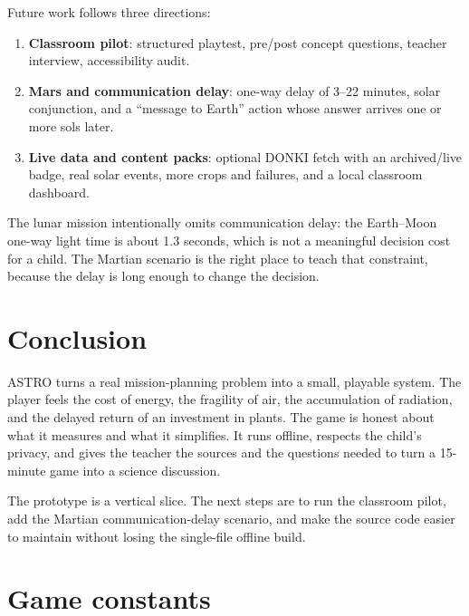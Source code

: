 \documentclass[11pt,a4paper]{article}
\begin{document}
Future work follows three directions:

\begin{enumerate}
  \item \textbf{Classroom pilot}: structured playtest, pre/post concept questions, teacher interview, accessibility audit.
  \item \textbf{Mars and communication delay}: one-way delay of 3--22 minutes, solar conjunction, and a ``message to Earth'' action whose answer arrives one or more sols later.
  \item \textbf{Live data and content packs}: optional DONKI fetch with an archived/live badge, real solar events, more crops and failures, and a local classroom dashboard.
\end{enumerate}

The lunar mission intentionally omits communication delay: the Earth--Moon one-way light time is about 1.3 seconds, which is not a meaningful decision cost for a child. The Martian scenario is the right place to teach that constraint, because the delay is long enough to change the decision.

\section{Conclusion}

ASTRO turns a real mission-planning problem into a small, playable system. The player feels the cost of energy, the fragility of air, the accumulation of radiation, and the delayed return of an investment in plants. The game is honest about what it measures and what it simplifies. It runs offline, respects the child's privacy, and gives the teacher the sources and the questions needed to turn a 15-minute game into a science discussion.

The prototype is a vertical slice. The next steps are to run the classroom pilot, add the Martian communication-delay scenario, and make the source code easier to maintain without losing the single-file offline build.

\appendix

\section{Game constants}
\end{document}
